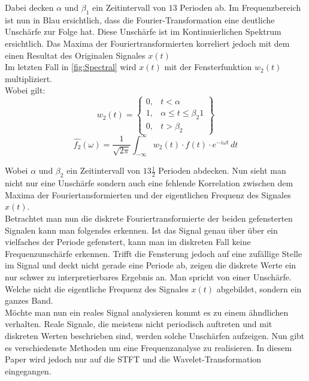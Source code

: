 Dabei decken $\alpha$ und $\beta_{1}$ ein Zeitintervall von $13$ Perioden ab. Im Frequenzbereich ist nun in Blau ersichtlich, dass die Fourier-Transformation eine deutliche Unschärfe zur Folge hat. Diese Unschärfe ist im Kontinuierlichen Spektrum ersichtlich. Das Maxima der Fouriertransformierten korreliert jedoch mit dem einen Resultat des Originalen Signales $x(t)$\\




Im letzten Fall in \ref{fig:Spectral} wird $x(t)$ mit der Fensterfunktion $w_{2}(t)$ multipliziert.\\
Wobei gilt: 
\begin{equation}
	w_{2}(t)= \left\{\begin{array}{lll}{0,}&{t<\alpha}  \\ {1,}&{\alpha\leq t \leq\beta_{2}}  {1}\\ {0,}&{t>\beta_{2}}\end{array}\right\}
\end{equation}
\begin{equation}
	\hat{f_{2}}(\omega)=\frac{1}{\sqrt{2 \pi}} \int_{-\infty}^{\infty} w_{2}(t)\cdot f(t) \cdot e^{-i \omega t} \,dt
\end{equation}

Wobei $\alpha$ und $\beta_{2}$ ein Zeitintervall von $13\frac{1}{2}$ Perioden abdecken. Nun sieht man nicht nur eine Unschärfe sondern auch eine fehlende Korrelation zwischen dem Maxima der Fouriertansformierten und der eigentlichen Frequenz des Signales $x(t)$.\\

Betrachtet man nun die diskrete Fouriertransformierte der beiden gefensterten Signalen kann man folgendes erkennen. Ist das Signal genau über über ein vielfaches der Periode gefenstert, kann man im diskreten Fall keine Frequenzunschärfe erkennen. Trifft die Fensterung jedoch auf eine zufällige Stelle im Signal und deckt nicht gerade eine Periode ab, zeigen die diskrete Werte ein nur schwer zu interpretierbares Ergebnis an. Man spricht von einer Unschärfe. Welche nicht die eigentliche Frequenz des Signales $x(t)$ abgebildet, sondern ein ganzes Band.\\
Möchte man nun ein reales Signal analysieren kommt es zu einem ähndlichen verhalten. Reale Signale, die meistens nicht periodisch auftreten und mit diskreten Werten beschrieben sind, werden solche Unschärfen aufzeigen. Nun gibt es verschiedenste Methoden um eine Frequenzanalyse zu realisieren. In diesem Paper wird jedoch nur auf die STFT und die Wavelet-Transformation eingegangen. 


